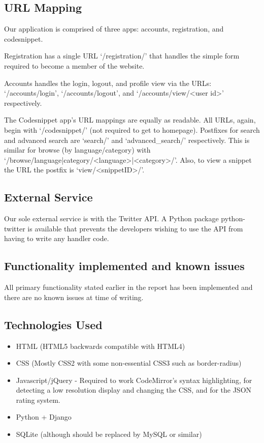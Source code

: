 \documentclass{sig-alt-release2}
\begin{document}
\subsection{URL Mapping}

Our application is comprised of three apps: accounts, registration, and
codesnippet. 

Registration has a single URL `/registration/' that handles the
simple form required to become a member of the website.

Accounts handles the login, logout, and profile view via the URLs:
`/accounts/login', `/accounts/logout', and `/accounts/view/<user id>'
respectively.

The Codesnippet app's URL mappings are equally as readable. All URLs, again,
begin with `/codesnippet/' (not required to get to homepage). Postfixes for
search and advanced search are `search/' and `advanced\_search/' respectively.
This is similar for browse (by language/category) with
 `/browse/language|category/<language>|<category>/'. Also, to view a snippet
the URL the postfix is `view/<snippetID>/'.

\subsection{External Service}

Our sole external service is with the Twitter API. A Python package
python-twitter is available that prevents the developers wishing to use the
API from having to write any handler code.

\subsection{Functionality implemented and known issues}

All primary functionality stated earlier in the report has been implemented and
there are no known issues at time of writing.

\subsection{Technologies Used}

\begin{itemize}
\item HTML (HTML5 backwards compatible with HTML4)
\item CSS (Mostly CSS2 with some non-essential CSS3 such as border-radius)
\item Javascript/jQuery - Required to work CodeMirror's syntax highlighting,
for detecting a low resolution display and changing the CSS, and for the JSON
rating system.
\item Python + Django
\item SQLite (although should be replaced by MySQL or similar)
\end{itemize}
\end{document}
